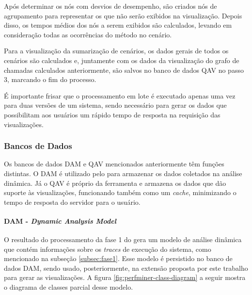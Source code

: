 Após determinar os nós com desvios de desempenho, são criados nós de agrupamento para representar os que não serão exibidos na visualização. Depois disso, os tempos médios dos nós a serem exibidos são calculados, levando em consideração todas as ocorrências do método no cenário.

Para a visualização da sumarização de cenários, os dados gerais de todos os cenários são calculados e, juntamente com os dados da visualização do grafo de chamadas calculados anteriormente, são salvos no banco de dados QAV no passo 3, marcando o fim do processo.

É importante frisar que o processamento em lote é executado apenas uma vez para duas versões de um sistema, sendo necessário para gerar os dados que possibilitam aos usuários um rápido tempo de resposta na requisição das visualizações.

\FloatBarrier

\subsubsection{Bancos de Dados} \label{subsec:databases}

Os bancos de dados DAM e QAV mencionados anteriormente têm funções distintas. O DAM é utilizado pelo \textit{\perfMinerName} para armazenar os dados coletados na análise dinâmica. Já o QAV é próprio da ferramenta \textit{\toolName} e armazena os dados que dão suporte às visualizações, funcionando também como um \textit{cache}, minimizando o tempo de resposta do servidor para o usuário.

\paragraph{DAM - \textit{Dynamic Analysis Model}} \label{par:estrutura-dados-dam}

O resultado do processamento da fase 1 do \textit{\perfMinerName} gera um modelo de análise dinâmica que contém informações sobre os \textit{traces} de execução do sistema, como mencionado na subseção \ref{subsec:fase1}. Esse modelo é persistido no banco de dados DAM, sendo usado, posteriormente, na extensão proposta por este trabalho para gerar as visualizações. A figura \ref{fig:perfminer-class-diagram} a seguir mostra o diagrama de classes parcial desse modelo.

